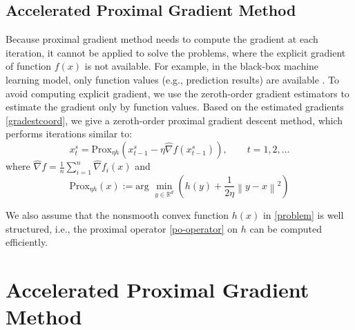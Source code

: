 \documentclass{article}
\newcommand*{\R}{\mathbb{R}}
\newcommand*{\Po}{\text{Prox}}
\newcommand{\norm}[1]{\left\lVert#1\right\rVert}
\theoremstyle{definition}
\theoremstyle{remark}
\begin{document}
\subsection{Accelerated Proximal Gradient Method}
{\color{Green}
Because proximal gradient method needs to compute
the gradient at each iteration, it cannot be applied to solve the problems, where the explicit gradient of function $f(x)$ is
not available. For example, in the black-box machine learning model, only function values (e.g., prediction results) are
available \cite{chen2017zoo}. To avoid computing explicit gradient, we use the zeroth-order gradient estimators \cite{nesterov2017random,liu2018zeroth} to estimate the
gradient only by function values.
Based on the estimated gradients \eqref{gradestcoord}, we give a zeroth-order proximal gradient descent method, which performs  iterations similar to:
\begin{equation}
x_{t}^s= \Po_{\eta h}(x_{t-1}^s - \eta \hat{\nabla} f(x_{t-1}^s)),\qquad t=1, 2, \ldots
\end{equation}
where $\hat{\nabla} f=\frac{1}{n}\sum_{i=1}^n \hat{\nabla} f_i(x)$ and 
\begin{equation}\label{po-operator}
\Po_{\eta h}(x) := \text{arg}\,\,\min_{y\in\R^d}\left(h(y)+\frac{1}{2\eta}\norm{y-x}^2\right)
\end{equation}
}
{\color{Green}


{\color{Violet}
We also assume that the
nonsmooth convex function $h(x)$ in \eqref{problem} is well structured, i.e., the proximal operator \eqref{po-operator} on $h$ can be computed efficiently.

}
}
\section{Accelerated Proximal Gradient Method}
\end{document}
